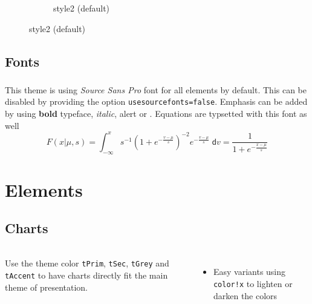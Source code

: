 \begin{frame}[fragile=singleslide]{\insertsectionhead}
\begin{figure}[ht!]
\begin{subfigure}[b]{0.3\textwidth}
      \caption*{style2 (default)}
    \end{subfigure}
  \end{figure}
\end{frame}

\subsection{Fonts}

\begin{frame}
  \frametitle{\insertsectionhead}
  \framesubtitle{\insertsubsectionhead}
  This theme is using \textit{Source Sans Pro} font for all elements by default.
  This can be disabled by providing the option \texttt{usesourcefonts=false}.
  \vfill
  Emphasis can be added by using \textbf{bold} typeface, \textit{italic},
  \alert{alert} or {\color{tPrim}{simple colors}}.
  \vfill
  Equations are typsetted with this font as well
  \begin{equation*}
    F(x|\mu,s) = \int_{-\infty}^x s^{-1}\left(1+e^{-\frac{v-\mu}{s}}\right)^{-2} e^{-\frac{v-\mu}{s}}\;\mathsf{d}v = \frac{1}{1+e^{-\frac{x-\mu}{s}}}
  \end{equation*}
\end{frame}


\section{Elements}
\subsection{Charts}
\begin{frame}{\insertsectionhead}
  \framesubtitle{\insertsubsectionhead}
  \begin{columns}[c, onlytextwidth]
    Use the theme color \texttt{tPrim}, \texttt{tSec}, \texttt{tGrey} and
    \texttt{tAccent} to have charts directly fit the main theme of presentation.
    \vfill
    \begin{itemize}
      \item Easy variants using \texttt{color!x} to lighten or darken the colors
    \end{itemize}
    \hfill
    \center
  \end{columns}
\end{frame}

